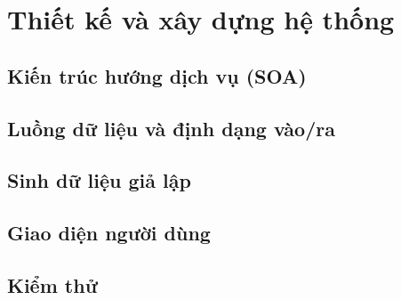 
\chapter{Thiết kế và xây dựng hệ thống}
\label{ch:he-thong}

\section{Kiến trúc hướng dịch vụ (SOA)}
\label{sec:soa}

\section{Luồng dữ liệu và định dạng vào/ra}
\label{sec:luong-du-lieu}

\section{Sinh dữ liệu giả lập}
\label{sec:sinh-du-lieu}

\section{Giao diện người dùng}
\label{sec:giao-dien}

\section{Kiểm thử}
\label{sec:kiem-thu}
